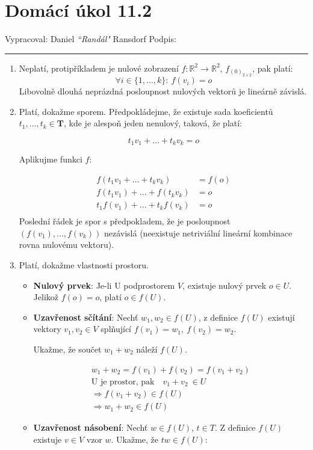 \documentclass[12pt]{article}
\begin{document}
\section*{Domácí úkol 11.2}

Vypracoval: Daniel \textit{``Randál"} Ransdorf \hfill Podpis: \rule{4cm}{0.4pt}

\begin{enumerate}

  \item Neplatí, protipříkladem je nulové zobrazení $f: \mathbb{R}^2 \to \mathbb{R}^2$, $f_{(0)_{2\times2}}$, pak platí:
      \[
        \forall i \in \{1,...,k\} :\ f(v_i) = o
      \]
    Libovolně dlouhá neprázdná posloupnost nulových vektorů je lineárně závislá.
  
  \item Platí, dokažme sporem. Předpokládejme, že existuje sada koeficientů $t_1,...,t_k \in \textbf{T}$,
    kde je alespoň jeden nenulový, taková, že platí:

    \[
      t_1v_1 + ... + t_kv_k = o
    \]

    Aplikujme funkci $f$:

    \begin{align*}
      f(t_1v_1 + ... + t_kv_k) &= f(o) \\
      f(t_1v_1) + ... + f(t_kv_k) &= o \\
      t_1f(v_1) + ... + t_kf(v_k) &= o \\
    \end{align*}
    Poslední řádek je spor s předpokladem, že je posloupnost $\left(f(v_1),...,f(v_k)\right)$ nezávislá
    (neexistuje netriviální lineární kombinace rovna nulovému vektoru).
  
    \item Platí, dokažme vlastnosti prostoru.
    
    \begin{itemize}
      \item \textbf{Nulový prvek}: Je-li U podprostorem $V$, existuje nulový prvek $o\in U$. Jelikož $f(o) = o$, platí $o \in f(U)$.
      \item \textbf{Uzavřenost sčítání}: Nechť $w_1,w_2 \in f(U)$, z definice $f(U)$ existují vektory $v_1,v_2 \in V$ splňující
        $f(v_1) = w_1,\ f(v_2) = w_2$.

        Ukažme, že součet $w_1+w_2$ náleží $f(U)$.

        \begin{align*}
          w_1 + w_2 = f(v_1) + f(v_2) = f(v_1+v_2) \\
          \text{U je prostor, pak} \quad v_1+v_2\ \in U\\
          \Longrightarrow f(v_1+v_2) \in f(U) \\
          \Longrightarrow w_1 + w_2 \in f(U)
        \end{align*}
      \item \textbf{Uzavřenost násobení}: Nechť $w\in f(U)$, $t\in T$. Z definice $f(U)$ existuje $v\in V$ vzor $w$.
        Ukažme, že $tw \in f(U)$:
        

\end{itemize}
\end{enumerate}
\end{document}
